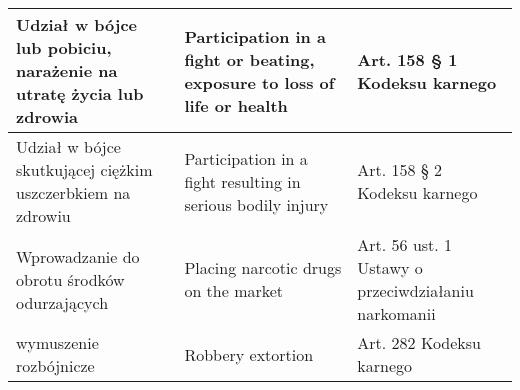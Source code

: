 \documentclass[preprint,12pt,number]{elsarticle}
\begin{document}
\begin{table}[h]
\begin{tabular}{|p{5cm}|p{5cm}|p{5cm}|}
\\ \hline
Udział w bójce lub pobiciu, narażenie na utratę życia lub zdrowia  & Participation in a fight or beating, exposure to loss of life or health   & Art. 158 § 1 Kodeksu karnego  
\\ \hline
Udział w bójce skutkującej ciężkim uszczerbkiem na zdrowiu  & Participation in a fight resulting in serious bodily injury  & Art. 158 § 2 Kodeksu karnego
\\ \hline
Wprowadzanie do obrotu środków odurzających  & Placing narcotic drugs on the market   & Art. 56 ust. 1 Ustawy o   przeciwdziałaniu narkomanii 
\\ \hline
wymuszenie rozbójnicze & Robbery extortion   & Art. 282 Kodeksu karnego \\ \hline
\end{tabular}
\end{table}
\end{document}
